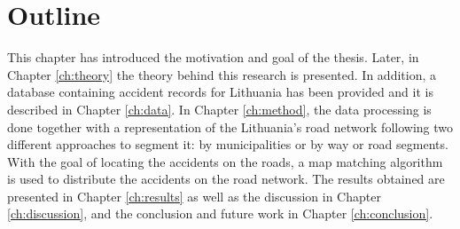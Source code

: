 \section{Outline}
This chapter has introduced the motivation and goal of the thesis. Later, in Chapter \ref{ch:theory} the theory behind this research is presented. In addition, a database containing accident records for Lithuania has been provided and it is described in Chapter \ref{ch:data}. In Chapter \ref{ch:method}, the data processing is done together with a representation of the Lithuania's road network following two different approaches to segment it: by municipalities or by way or road segments. With the goal of locating the accidents on the roads, a map matching algorithm is used to distribute the accidents on the road network. The results obtained are presented in Chapter \ref{ch:results} as well as the discussion in Chapter \ref{ch:discussion}, and the conclusion and future work in Chapter \ref{ch:conclusion}.

